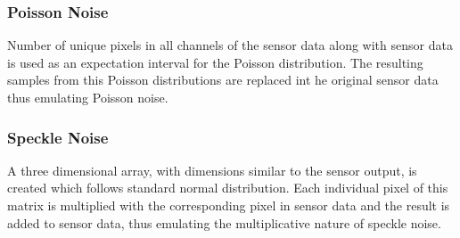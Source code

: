\medskip

\subsubsection{Poisson Noise} Number of unique pixels in all channels of the sensor data along with sensor data is used as an expectation interval for the Poisson distribution. The resulting samples from this Poisson distributions are replaced int he original sensor data thus emulating Poisson noise.

\medskip

\subsubsection{Speckle Noise} A three dimensional array, with dimensions similar to the sensor output, is created which follows standard normal distribution. Each individual pixel of this matrix is multiplied with the corresponding pixel in sensor data and the result is added to sensor data, thus emulating the multiplicative nature of speckle noise.   